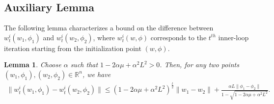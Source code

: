 \documentclass{osudissert96}
\newtheorem{lemma}{Lemma}
\begin{document}
\subsection*{Auxiliary Lemma}
The following lemma characterizes a bound on the difference between $w_{t}^{i}(w_1,\phi_1)$ and $w_{t}^{i}(w_2,\phi_2)$, where $w_{t}^{i}(w,\phi)$ corresponds to the $t^{th}$ inner-loop iteration starting from the initialization point $(w,\phi)$.
\begin{lemma}\label{le:support}
Choose $\alpha$ such that $1-2\alpha\mu+\alpha^2L^2>0$. Then, 
for any two points $(w_1,\phi_1),(w_2,\phi_2)\in\mathbb{R}^n$, we have 
\begin{align*}
\big\|w_{t}^{i}(w_1,\phi_1)- w_{t}^{i}(w_2,\phi_2)\big\| \leq (1-2\alpha\mu+\alpha^2L^2)^{\frac{t}{2}}\|w_1-w_2\| + \frac{\alpha L\|\phi_1-\phi_2\|}{1-\sqrt{1-2\alpha\mu+\alpha^2L^2}}.
\end{align*}
\end{lemma}
\end{document}
